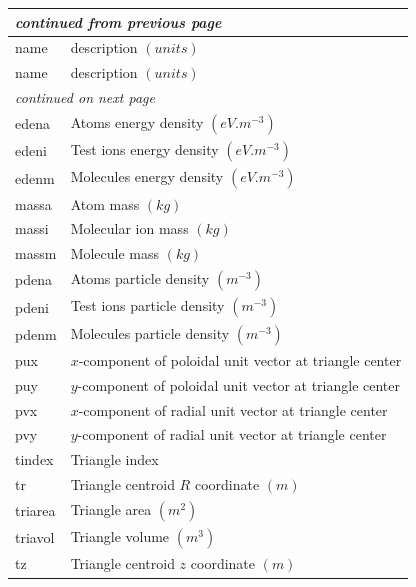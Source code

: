 \documentclass[a4paper,10pt]{report}
\begin{document}
\begin{center}
  \begin{longtable}{|l|l|}
    \hline
    \multicolumn{2}{|l|}{\small\sl continued from previous page} \\
    \hline name & description $(units)$ \\
    \hline \endhead
    \hline name & description $(units)$ \\
    \hline \endfirsthead
    \hline
    \multicolumn{2}{|l|}{\small\sl continued on next page} \\
    \hline \endfoot
    \endlastfoot
    edena \index{b2plot, edena} & Atoms energy density $(eV.m^{-3})$ \\
    edeni \index{b2plot, edeni} & Test ions energy density $(eV.m^{-3})$ \\
    edenm \index{b2plot, edenm} & Molecules energy density $(eV.m^{-3})$ \\
    massa \index{b2plot, massa} & Atom mass $(kg)$ \\
    massi \index{b2plot, massi} & Molecular ion mass $(kg)$ \\
    massm \index{b2plot, massm} & Molecule mass $(kg)$ \\
    pdena \index{b2plot, pdena} & Atoms particle density $(m^{-3})$ \\
    pdeni \index{b2plot, pdeni} & Test ions particle density $(m^{-3})$ \\
    pdenm \index{b2plot, pdenm} & Molecules particle density $(m^{-3})$ \\
    pux \index{b2plot, pux} & $x$-component of poloidal unit vector at triangle center \\
    puy \index{b2plot, puy} & $y$-component of poloidal unit vector at triangle center \\
    pvx \index{b2plot, pvx} & $x$-component of radial unit vector at triangle center \\
    pvy \index{b2plot, pvy} & $y$-component of radial unit vector at triangle center \\
    tindex \index{b2plot, tindex} & Triangle index \\
    tr \index{b2plot,tr} & Triangle centroid $R$ coordinate $(m)$ \\
    triarea \index{b2plot, triarea} & Triangle area $(m^{2})$ \\
    triavol \index{b2plot, triavol} & Triangle volume $(m^{3})$ \\
    tz \index{b2plot,tz} & Triangle centroid $z$ coordinate $(m)$ \\

\end{longtable}
\end{center}
\end{document}
